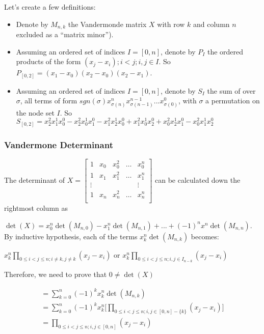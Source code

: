 \documentclass[11pt, oneside]{article} 	%
\begin{document}
Let's create a few definitions: 
\begin{itemize}
\item Denote by $M_{n,k}$ the Vandermonde matrix  $X$ with row $k$ and column $n$ excluded as a ``matrix minor'').
\item Assuming an ordered set of indices $I = [0, n]$, denote by $P_I$ the ordered products of the form $(x_j - x_i); i < j; i, j \in I$.  So $P_{[0,2]} = (x_1 - x_0)(x_2-x_0)(x_2- x_1)$.
\item Assuming an ordered set of indices $I = [0, n]$, denote by $S_I$ the sum of over $\sigma$, all terms of form $sgn(\sigma) x_{\sigma(n)}^{n} x_{\sigma(n-1)}^{n-1} ... x_{\sigma(0)}^{0} $, with $\sigma$ a permutation on the node set $I$.  So $S_{[0,2]} = x_2^2x_1^1x_0^0 - x_2^2x_0^1x_1^0 - x_1^2x_2^1x_0^0 + x_1^2x_0^1x_2^0 + x_0^2x_2^1x_1^0 - x_0^2x_1^1x_2^0$
\end{itemize}

\subsubsection{Vandermone Determinant}

The determinant of 
 $X = \begin{bmatrix}
1 & x_0 & x_0^2 & \ldots & x_0^{n} \\
1 & x_1 & x_1^2 & \ldots & x_1^{n} \\
\vdots & & & & \vdots  \\
1 & x_{n} & x_{n}^2 & \ldots & x_{n}^{n} \\
\end{bmatrix}
$ can be calculated down the rightmost column as

$\det(X) = x_0^n \det(M_{n,0}) - x_1^n \det(M_{n,1}) +  ... + (-1)^n x^n \det(M_{n,n})$.
\\

By inductive hypothesis, each of the terms $x_k^n\det(M_{n,k})$ becomes:

$x_k^n\prod_{0 \leq i < j \leq n; i \neq k, j \neq k} (x_j - x_i)$ 
or 
$x_k^n\prod_{0 \leq i < j \leq n; i, j \in I_{n-{k}}} (x_j - x_i)$ 


Therefore, we need to prove that $0 \neq \det(X)$

\begin{align}
= \sum_{k=0}^n (-1)^k x_k^n\det(M_{n, k}) \\
= \sum_{k=0}^n (-1)^k x_k^n\Big[\prod_{0 \leq i < j \leq n; i, j \in [0,n] - \{k\}} (x_j - x_i) \Big] \\
=\prod_{0 \leq i < j \leq n; i, j \in [0,n]} (x_j - x_i) 
\end{align}
\end{document}

